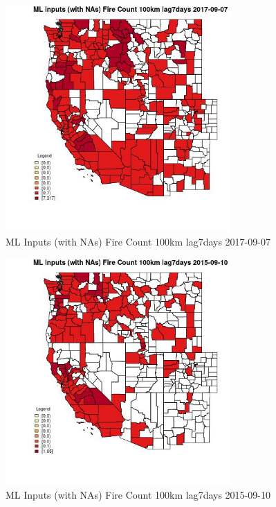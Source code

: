 \clearpage 

\begin{figure} 
\centering  
\includegraphics[width=0.77\textwidth]{Code_Outputs/Report_ML_input_PM25_Step4_part_e_de_duplicated_aves_compiled_2019-05-21wNAs_CountyFire_Count_100km_lag7daysMean2017-09-07.jpg} 
\caption{\label{fig:Report_ML_input_PM25_Step4_part_e_de_duplicated_aves_compiled_2019-05-21wNAsCountyFire_Count_100km_lag7daysMean2017-09-07}ML Inputs (with NAs) Fire Count 100km lag7days 2017-09-07} 
\end{figure} 
 

\begin{figure} 
\centering  
\includegraphics[width=0.77\textwidth]{Code_Outputs/Report_ML_input_PM25_Step4_part_e_de_duplicated_aves_compiled_2019-05-21wNAs_CountyFire_Count_100km_lag7daysMean2015-09-10.jpg} 
\caption{\label{fig:Report_ML_input_PM25_Step4_part_e_de_duplicated_aves_compiled_2019-05-21wNAsCountyFire_Count_100km_lag7daysMean2015-09-10}ML Inputs (with NAs) Fire Count 100km lag7days 2015-09-10} 
\end{figure} 
 

